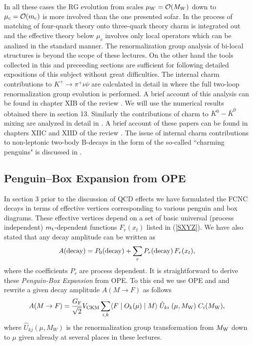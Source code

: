 \documentclass[12pt]{article}
\newcommand{\mt}{m_{\rm t}}
\newcommand{\mc}{m_{\rm c}}
\newcommand{\mw}{M_{\rm W}}
\newcommand{\ord}{{\cal O}}
\def\kpn{K^+\rightarrow\pi^+\nu\bar\nu}
\begin{document}
\begin{itemize}
\begin{itemize}
In all these cases the RG evolution from scales $\mu_W=\ord(M_W)$
down to $\mu_c=\ord(\mc)$ is more involved than the one presented
sofar. In the process of matching of four-quark theory onto
three-quark theory charm is integrated out and the effective theory
below $\mu_c$ involves only local operators which can be analized
in the standard manner. The renormalization group analysis of
bi-local structures is beyond the scope of these lectures.
On the other hand the tools collected in this and preceeding sections
are sufficient for following detailed expositions of this subject
without great difficulties. The internal charm contributions to
$\kpn$ are calculated in detail in \cite{BB3} where the full two-loop
renormalization group evolution is performed. A brief account of this
analysis can be found in chapter XIB of the review \cite{BBL}. We will use
the numerical results obtained there in section 13. Similarly
   the contributions of charm to $K^0-\bar K^0$ mixing are analyzed
in detail in \cite{HNa,HNb}. A brief account of these papers can be found
in chapters XIIC and XIID of the review \cite{BBL}.
The issue of internal charm contributions to non-leptonic two-body 
B-decays
in the form of the so-called ``charming penguins" 
is discussed in \cite{BF95,ITAL}.
\subsection{Penguin--Box Expansion from OPE}
In section 3 prior to the discussion of QCD effects we have formulated
the FCNC decays in terms of effective vertices corresponding to
various penguin and box diagrams. These effective vertices depend on
a set of basic universal (process independent) 
$\mt$-dependent functions $F_r(x_t)$ listed in 
(\ref{SXYZ}). We have also stated that any decay amplitude can be
written as
\begin{equation}
A({\rm decay}) = P_0({\rm decay}) + \sum_r P_r({\rm decay}) \, F_r(x_t),
\label{generalPBE1}
\end{equation}
where the coefficients $P_r$ are process dependent. It is
straightforward to derive these {\it Penguin-Box Expansion} \cite{PBE0}
from OPE.
To this end we use OPE and 
and rewrite a given decay amplitude $A(M\to F)$ as follows
\begin{equation}\label{USE}
A(M\to F)=\frac{G_{\rm F}}{\sqrt 2} V_{\rm CKM}
\sum_{i,k} \langle F\mid O_k(\mu)\mid M\rangle \;\hat U_{ki}\;(\mu,\mw) 
          \; C_i(\mw),
\end{equation}
where $\hat U_{kj}(\mu,M_W)$ is the renormalization group
transformation from $\mw$ down to $\mu$ given already at several
places in these lectures.


\end{itemize}
\end{itemize}
\end{document}
